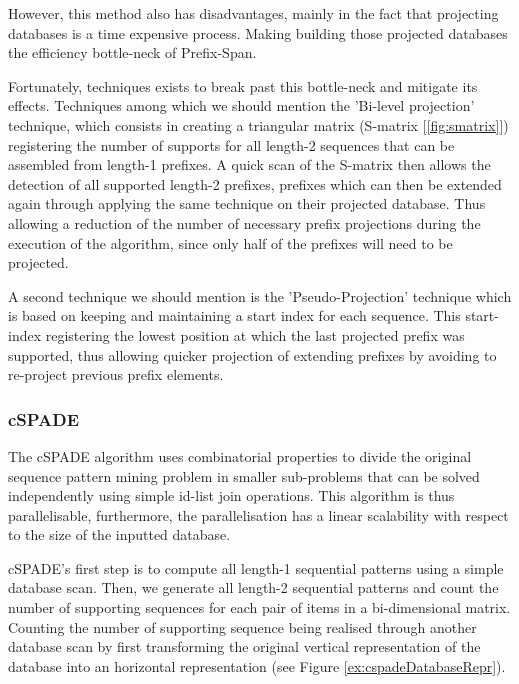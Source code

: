 \documentclass{eplmastersthesis}
\begin{document}
However, this method also has disadvantages, mainly in the fact that projecting databases is a time expensive process. Making building those projected databases the efficiency bottle-neck of Prefix-Span. \newline

Fortunately, techniques exists to break past this bottle-neck and mitigate its effects. Techniques among which we should mention the 'Bi-level projection' technique, which consists in creating a triangular matrix (S-matrix [\ref{fig:smatrix}]) registering the number of supports for all length-2 sequences that can be assembled from length-1 prefixes. A quick scan of the S-matrix then allows the detection of all supported length-2 prefixes, prefixes which can then be extended again through applying the same technique on their projected database. Thus allowing a reduction of the number of necessary prefix projections during the execution of the algorithm, since only half of the prefixes will need to be projected. \newline

A second technique we should mention is the 'Pseudo-Projection' technique which is based on keeping and maintaining a start index for each sequence. This start-index registering the lowest position at which the last projected prefix was supported, thus allowing quicker projection of extending prefixes by avoiding to re-project previous prefix elements.

\subsubsection{cSPADE}

The cSPADE algorithm \cite{zaki2001spade} uses combinatorial properties to divide the original sequence pattern mining problem in smaller sub-problems that can be solved independently using simple id-list join operations. This algorithm is thus parallelisable, furthermore, the parallelisation has a linear scalability with respect to the size of the inputted database. \newline

cSPADE's first step is to compute all length-1 sequential patterns using a simple database scan. Then, we generate all length-2 sequential patterns and count the number of supporting sequences for each pair of items in a bi-dimensional matrix. Counting the number of supporting sequence being realised through another database scan by first transforming the original vertical representation of the database into an horizontal representation (see Figure \ref{ex:cspadeDatabaseRepr}).
\end{document}
